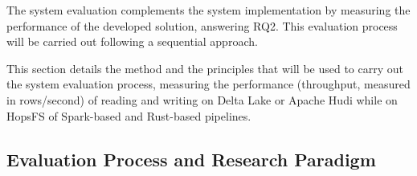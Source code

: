 The system evaluation complements the system implementation by measuring the performance of the developed solution, answering RQ2. This evaluation process will be carried out following a sequential approach.

This section details the method and the principles that will be used to carry out the system evaluation process, measuring the performance (throughput, measured in rows/second) of reading and writing on Delta Lake or Apache Hudi while on \gls{HopsFS} of Spark-based and Rust-based pipelines. 

\subsection{Evaluation Process and Research Paradigm}
\label{subsec:eval_process_and_research_paradigm}

